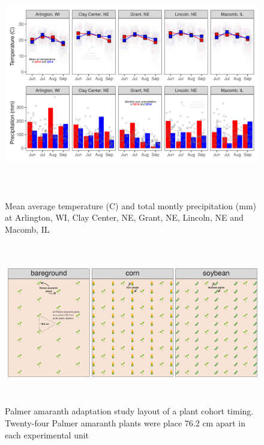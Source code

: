 \documentclass[utf8]{frontiersSCNS}
\begin{document}
\begin{figure}

{\centering \includegraphics[width=160mm,height=100mm]{../data analysis/weather/Figure 1} 

}

\caption{Mean average temperature (C) and total montly precipitation (mm) at Arlington, WI, Clay Center, NE, Grant, NE, Lincoln, NE and Macomb, IL}\label{fig:Figure-1}
\end{figure}

\begin{figure}

{\centering \includegraphics[width=150mm,height=70mm]{../data analysis/figures/Figure 2} 

}

\caption{Palmer amaranth adaptation study layout of a plant cohort timing. Twenty-four Palmer amaranth plants were place 76.2 cm apart in each experimental unit}\label{fig:Figure-2}
\end{figure}
\end{document}
